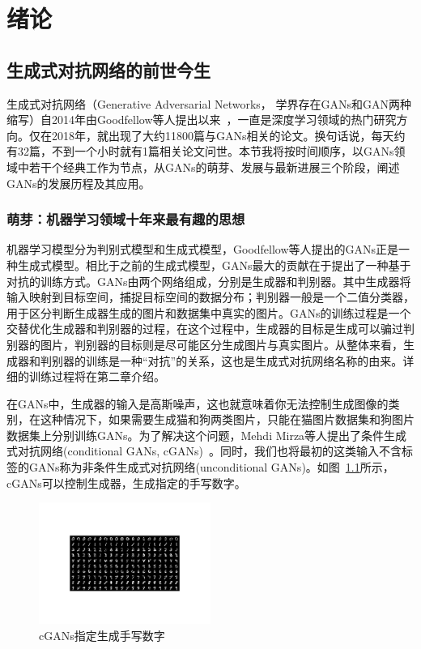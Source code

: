 \chapter{绪论}

\section{生成式对抗网络的前世今生}

生成式对抗网络（Generative Adversarial Networks， 学界存在GANs和GAN两种缩写）自2014年由Goodfellow等人提出以来~\cite{GANs}，一直是深度学习领域的热门研究方向。仅在2018年，就出现了大约11800篇与GANs相关的论文。换句话说，每天约有32篇，不到一个小时就有1篇相关论文问世\cite{review}。本节我将按时间顺序，以GANs领域中若干个经典工作为节点，从GANs的萌芽、发展与最新进展三个阶段，阐述GANs的发展历程及其应用。

\subsection{萌芽：机器学习领域十年来最有趣的思想}
机器学习模型分为判别式模型和生成式模型，Goodfellow等人提出的GANs正是一种生成式模型。相比于之前的生成式模型，GANs最大的贡献在于提出了一种基于对抗的训练方式。GANs由两个网络组成，分别是生成器和判别器。其中生成器将输入映射到目标空间，捕捉目标空间的数据分布；判别器一般是一个二值分类器，用于区分判断生成器生成的图片和数据集中真实的图片。GANs的训练过程是一个交替优化生成器和判别器的过程，在这个过程中，生成器的目标是生成可以骗过判别器的图片，判别器的目标则是尽可能区分生成图片与真实图片。从整体来看，生成器和判别器的训练是一种“对抗”的关系，这也是生成式对抗网络名称的由来。详细的训练过程将在第二章介绍。

在GANs中，生成器的输入是高斯噪声，这也就意味着你无法控制生成图像的类别，在这种情况下，如果需要生成猫和狗两类图片，只能在猫图片数据集和狗图片数据集上分别训练GANs。为了解决这个问题，Mehdi Mirza等人提出了条件生成式对抗网络(conditional GANs, cGANs)~\cite{CGANs}。同时，我们也将最初的这类输入不含标签的GANs称为非条件生成式对抗网络(unconditional GANs)。如图~\ref{CGAN-result}所示，cGANs可以控制生成器，生成指定的手写数字。

\begin{figure}
    \centering
    \includegraphics[width=0.5\textwidth]{figures/CGAN-result.pdf}
    \caption{cGANs指定生成手写数字}
    \label{CGAN-result}
\end{figure}

